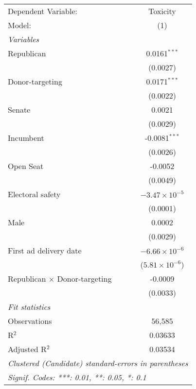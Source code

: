 
\begingroup
\centering
\begin{tabular}{lc}
   \tabularnewline \midrule \midrule
   Dependent Variable:                  & Toxicity\\  
   Model:                               & (1)\\  
   \midrule
   \emph{Variables}\\
   Republican                           & 0.0161$^{***}$\\   
                                        & (0.0027)\\   
   Donor-targeting                      & 0.0171$^{***}$\\   
                                        & (0.0022)\\   
   Senate                               & 0.0021\\   
                                        & (0.0029)\\   
   Incumbent                            & -0.0081$^{***}$\\   
                                        & (0.0026)\\   
   Open Seat                            & -0.0052\\   
                                        & (0.0049)\\   
   Electoral safety                     & $-3.47\times 10^{-5}$\\    
                                        & (0.0001)\\   
   Male                                 & 0.0002\\   
                                        & (0.0029)\\   
   First ad delivery date               & $-6.66\times 10^{-6}$\\    
                                        & ($5.81\times 10^{-6}$)\\    
   Republican $\times$ Donor-targeting  & -0.0009\\   
                                        & (0.0033)\\   
   \midrule
   \emph{Fit statistics}\\
   Observations                         & 56,585\\  
   R$^2$                                & 0.03633\\  
   Adjusted R$^2$                       & 0.03534\\  
   \midrule \midrule
   \multicolumn{2}{l}{\emph{Clustered (Candidate) standard-errors in parentheses}}\\
   \multicolumn{2}{l}{\emph{Signif. Codes: ***: 0.01, **: 0.05, *: 0.1}}\\
\end{tabular}
\par\endgroup


